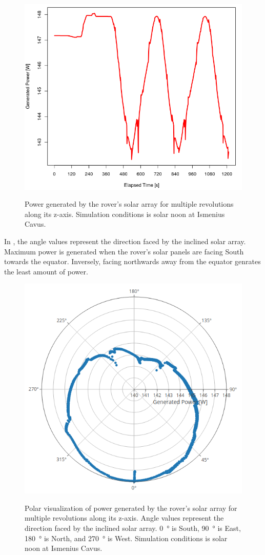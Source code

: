 \begin{figure}[h]
  \captionsetup[subfigure]{justification=centering}
  \centering
  \hypersetup{linkcolor=captionTextColor}
  \includegraphics[width=0.5\linewidth]{sections/design/simulation/plots/rover-generated-power.png}\\
  \caption[Power generated by the rover's solar array for multiple revolutions along its z-axis]
          {Power generated by the rover's solar array for multiple revolutions along its z-axis. Simulation conditions is solar noon at Ismenius Cavus.}
  \label{fig:simulation-data-rover-revolution-generated-power}
\end{figure}

In , the angle values represent the direction faced by the inclined solar array. Maximum power is generated when the rover's solar panels are facing South towards the equator. Inversely, facing northwards away from the equator genrates the least amount of power.


\begin{figure}[h]
  \captionsetup[subfigure]{justification=centering}
  \centering
  \hypersetup{linkcolor=captionTextColor}
  \includegraphics[width=0.4\linewidth]{sections/design/simulation/plots/rover-revolution-generated-power.png}\\
  \caption[Polar visualization of power generated by the rover's solar array for multiple revolutions along its z-axis]
          {Polar visualization of power generated by the rover's solar array for multiple revolutions along its z-axis. Angle values represent the direction faced by the inclined solar array. \SI{0}{\degree} is South, \SI{90}{\degree} is East, \SI{180}{\degree} is North, and \SI{270}{\degree} is West. Simulation conditions is solar noon at Ismenius Cavus.}
  \label{fig:simulation-data-rover-revolution-generated-power-polar}
\end{figure}

